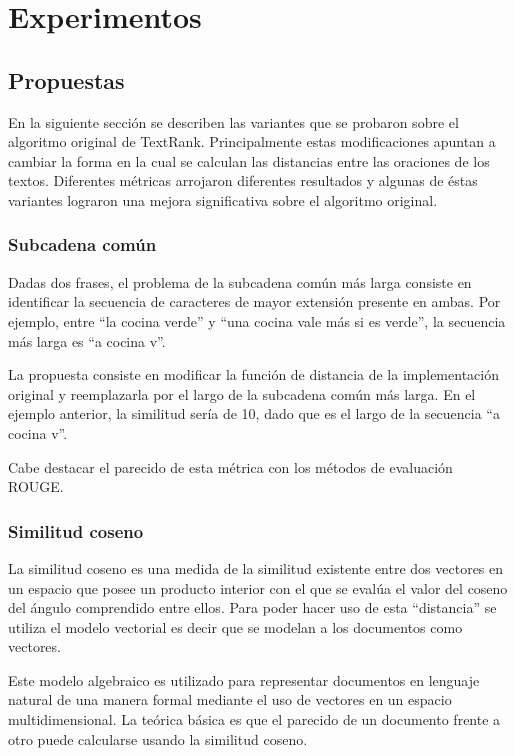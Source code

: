 \documentclass{llncs}
\begin{document}
\section{Experimentos}

\subsection{Propuestas}
En la siguiente sección se describen las variantes que se probaron sobre el algoritmo original de
TextRank. Principalmente estas modificaciones apuntan a cambiar la forma en la cual se calculan las distancias entre las oraciones de los textos. Diferentes métricas arrojaron diferentes resultados y algunas de éstas variantes lograron una mejora significativa sobre el algoritmo original.

\subsubsection{Subcadena común}
Dadas dos frases, el problema de la subcadena común más larga consiste en identificar la secuencia de caracteres de mayor extensión presente en ambas. Por ejemplo, entre “la cocina verde” y “una cocina vale más si es verde”, la secuencia más larga es “a cocina v”.

La propuesta consiste en modificar la función de distancia de la implementación original y reemplazarla por el largo de la subcadena común más larga. En el ejemplo anterior, la similitud sería de 10, dado que es el largo de la secuencia “a cocina v”.

Cabe destacar el parecido de esta métrica con los métodos de evaluación ROUGE.


\subsubsection{Similitud coseno}
La similitud coseno es una medida de la similitud existente entre dos vectores en un espacio que posee un producto interior con el que se evalúa el valor del coseno del ángulo comprendido entre ellos. Para poder hacer uso de esta “distancia” se utiliza el modelo vectorial es decir que se modelan a los documentos como vectores.

Este modelo algebraico es utilizado para representar documentos en lenguaje natural de una manera formal mediante el uso de vectores en un espacio multidimensional. La teórica básica es que el parecido de un documento frente a otro puede calcularse usando la similitud coseno. 
\end{document}

